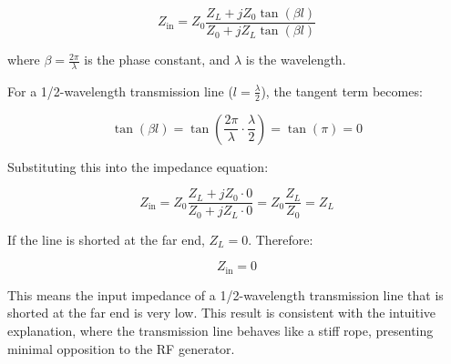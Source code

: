 \[
Z_{\text{in}} = Z_0 \frac{Z_L + j Z_0 \tan(\beta l)}{Z_0 + j Z_L \tan(\beta l)}
\]

where \( \beta = \frac{2\pi}{\lambda} \) is the phase constant, and \( \lambda \) is the wavelength.

For a 1/2-wavelength transmission line (\( l = \frac{\lambda}{2} \)), the tangent term becomes:

\[
\tan(\beta l) = \tan\left(\frac{2\pi}{\lambda} \cdot \frac{\lambda}{2}\right) = \tan(\pi) = 0
\]

Substituting this into the impedance equation:

\[
Z_{\text{in}} = Z_0 \frac{Z_L + j Z_0 \cdot 0}{Z_0 + j Z_L \cdot 0} = Z_0 \frac{Z_L}{Z_0} = Z_L
\]

If the line is shorted at the far end, \( Z_L = 0 \). Therefore:

\[
Z_{\text{in}} = 0
\]

This means the input impedance of a 1/2-wavelength transmission line that is shorted at the far end is very low. This result is consistent with the intuitive explanation, where the transmission line behaves like a stiff rope, presenting minimal opposition to the RF generator.


